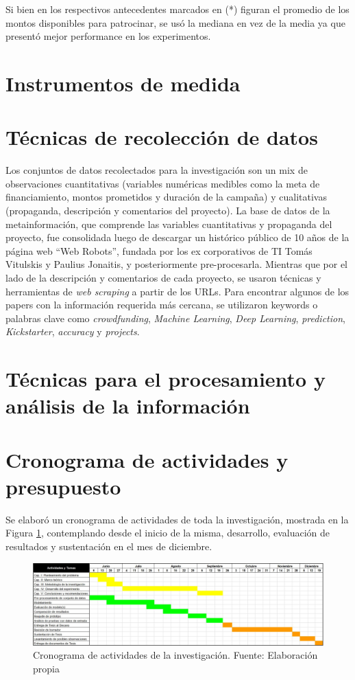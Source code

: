 Si bien en los respectivos antecedentes marcados en (*) figuran el promedio de los montos disponibles para patrocinar, se usó la mediana en vez de la media ya que presentó mejor performance en los experimentos.

\section{Instrumentos de medida}


\section{Técnicas de recolección de datos}
Los conjuntos de datos recolectados para la investigación son un mix de observaciones cuantitativas (variables numéricas medibles como la meta de financiamiento, montos prometidos y duración de la campaña) y cualitativas (propaganda, descripción y comentarios del proyecto). La base de datos de la metainformación, que comprende las variables cuantitativas y propaganda del proyecto, fue consolidada luego de descargar un histórico público de 10 años de la página web “Web Robots”, fundada por los ex corporativos de TI Tomás Vitulskis y Paulius Jonaitis, y posteriormente pre-procesarla. Mientras que por el lado de la descripción y comentarios de cada proyecto, se usaron técnicas y herramientas de \textit{web scraping} a partir de los URLs. Para encontrar algunos de los papers con la información requerida más cercana, se utilizaron keywords o palabras clave como \textit{crowdfunding}, \textit{Machine Learning}, \textit{Deep Learning}, \textit{prediction}, \textit{Kickstarter}, \textit{accuracy} y \textit{projects}.


\section{Técnicas para el procesamiento y análisis de la información}



\section{Cronograma de actividades y presupuesto}
Se elaboró un cronograma de actividades de toda la investigación, mostrada en la Figura \ref{3:fig2}, contemplando desde el inicio de la misma, desarrollo, evaluación de resultados y sustentación en el mes de diciembre.
\begin{figure}[h]
	\begin{center}
		\includegraphics[width=1.1\textwidth]{3/figures/cronograma.jpg}
		\caption{Cronograma de actividades de la investigación. Fuente: Elaboración propia}
		\label{3:fig2}
	\end{center}
\end{figure}